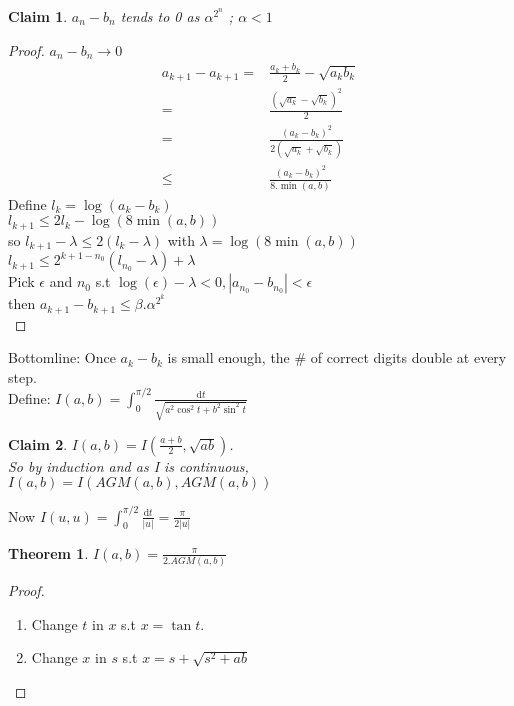 \documentclass{article}
\newtheorem{claim}{Claim}
\newtheorem{theorem}{Theorem}
\theoremstyle{definition}
\theoremstyle{remark}
\begin{document}
\begin{claim}
	$a_n-b_n$ tends to 0 as $\alpha^{2^n}$ ; $\alpha < 1$
\end{claim}
\begin{proof}
	$a_n-b_n\rightarrow 0$\\
	\begin{align*}
	a_{k+1} - a_{k+1} = & \frac{a_k+b_k}{2} - \sqrt{a_kb_k}\\
	= & \frac{(\sqrt{a_k}-\sqrt{b_k})^2}{2}\\
	= & \frac{(a_k - b_k)^2}{2(\sqrt{a_k} + \sqrt{b_k})} \\
	\leq & \frac{(a_k-b_k)^2}{8.\min(a,b)}
	\end{align*}
	Define $l_k = \log(a_k-b_k)$\\
	$l_{k+1} \leq 2l_k - \log(8\min(a,b))$\\
	so $l_{k+1} - \lambda \leq 2(l_k - \lambda)$ with $\lambda = \log(8\min(a,b))$\\
	$l_{k+1} \leq 2^{k+1-n_0}(l_{n_0} - \lambda) + \lambda$\\
	Pick $\epsilon$ and $n_0$ s.t $\log(\epsilon) - \lambda < 0, |a_{n_0} - b_{n_0}| < \epsilon$\\
	then $a_{k+1} - b_{k+1} \leq \beta.\alpha^{2^k}$\\
\end{proof}
	
	Bottomline: Once $a_k-b_k$ is small enough, the \# of correct digits double at every step.\\
	Define: $I(a,b) = \int_{0}^{\pi/2}\frac{\mathrm{d}t}{\sqrt{a^2\cos^2t+b^2\sin^2t}}$
\begin{claim}
	$I(a,b) = I(\frac{a+b}{2},\sqrt{ab})$.\\
	So by induction and as I is continuous, $I(a,b) = I(AGM(a,b),AGM(a,b))$\\
\end{claim}	
Now $I(u,u) = \int_{0}^{\pi/2} \frac{\mathrm{d}t}{|u|} = \frac{\pi}{2|u|}$

\begin{theorem}
	$I(a,b) = \frac{\pi}{2.AGM(a,b)}$
	\end{theorem}
\begin{proof}
	\begin{enumerate}
		\item Change $t$ in $x$ s.t $x = \tan t$.
		\item Change $x$ in $s$ s.t $x = s + \sqrt{s^2 + ab}$
	\end{enumerate}
\end{proof}
\end{document}
